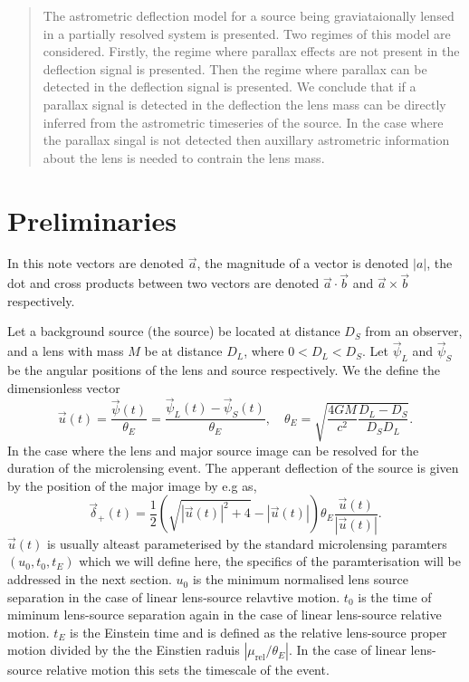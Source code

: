 \documentclass[11pt]{article}
\begin{document}
\maketitle

\begin{abstract}

The astrometric deflection model for a source being graviataionally lensed in a partially 
resolved system is presented. Two regimes of this model are considered. Firstly,
the regime where parallax effects are not present in the deflection signal is presented.
Then the regime where parallax can be detected in the deflection signal is presented.
We conclude that if a parallax signal is detected in the deflection the lens mass can be
directly inferred from the astrometric timeseries of the source. In the case where the
parallax singal is not detected then auxillary astrometric information about the lens
is needed to contrain the lens mass.

\end{abstract}

\section{Preliminaries}
In this note vectors are denoted $\vec{a}$, the magnitude of a vector is denoted $|a|$, 
the dot and cross products between two vectors are denoted $\vec{a}\cdot\vec{b}$ and 
$\vec{a}\times\vec{b}$ respectively.


Let a background source (the source) be located at distance $D_{S}$ from an observer, 
and a lens with mass $M$ be at distance $D_{L}$, where $0<D_{L}<D_{S}$. Let 
$\vec{\psi}_{L}$ and $\vec{\psi}_{S}$ be the angular positions of the lens and source 
respectively. We the define the dimensionless vector
%
\begin{equation}
\vec{u}(t) = \frac{\vec{\psi}(t)}{\theta_{E}} = 
          \frac{\vec{\psi}_{L}(t)-\vec{\psi}_{S}(t)}{\theta_{E}}, 
          \quad \theta_{E} = \sqrt{\frac{4GM}{c^{2}}\frac{D_{L}-D_{S}}{D_{S}D_{L}}}.
\end{equation}
%
In the case where the lens and major source image can be resolved for the duration 
of the microlensing event. The apperant deflection of the source is given by the 
position of the major image by e.g \cite{Bramich18} as,
%
\begin{equation}
\vec{\delta}_{+}(t) = \frac{1}{2}\left(\sqrt{|\vec{u}(t)|^{2}+4}-|\vec{u}(t)|\right)
                   \theta_{E}\frac{\vec{u}(t)}{|\vec{u}(t)|}.
\label{eq:shift}
\end{equation}
%
$\vec{u}(t)$ is usually alteast parameterised by the standard microlensing paramters 
$(u_{0},t_{0},t_{E})$ which we will define here, the specifics of the 
paramterisation will be addressed in the next section. $u_{0}$ is the minimum 
normalised lens source separation in the case of linear lens-source relavtive
motion. $t_{0}$ is the time of miminum lens-source separation again in the case 
of linear lens-source relative motion. $t_{E}$ is the Einstein time and is defined as the 
relative lens-source proper motion divided by the the Einstien raduis 
$|\mu_{\text{rel}}/\theta_{E}|$. In the case of linear lens-source relative motion this
sets the timescale of the event. 
%
\end{document}
